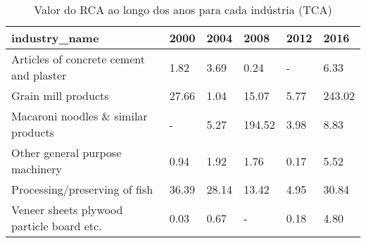 \begin{table}
\centering
\caption{Valor do RCA ao longo dos anos para cada indústria (TCA)}
\begin{tabular}{p{6cm}p{1.5cm}p{1.5cm}p{1.5cm}p{1.5cm}p{1.5cm}}
\toprule
                            industry\_name &  2000 &  2004 &   2008 & 2012 &   2016 \\
\midrule
  Articles of concrete cement and plaster &  1.82 &  3.69 &   0.24 &    - &   6.33 \\
                      Grain mill products & 27.66 &  1.04 &  15.07 & 5.77 & 243.02 \\
      Macaroni noodles \& similar products &     - &  5.27 & 194.52 & 3.98 &   8.83 \\
          Other general purpose machinery &  0.94 &  1.92 &   1.76 & 0.17 &   5.52 \\
            Processing/preserving of fish & 36.39 & 28.14 &  13.42 & 4.95 &  30.84 \\
Veneer sheets plywood particle board etc. &  0.03 &  0.67 &      - & 0.18 &   4.80 \\
\bottomrule
\end{tabular}
\end{table}
